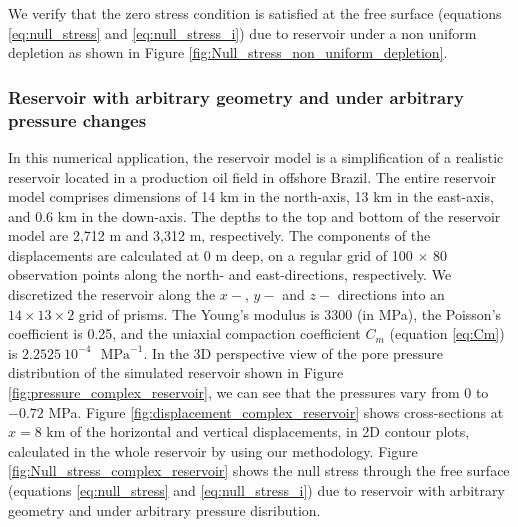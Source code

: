 \documentclass[journal abbreviation, manuscript]{copernicus}
\begin{document}
We verify that the zero stress condition is satisfied at the free surface (equations \ref{eq:null_stress} and \ref{eq:null_stress_i}) due to reservoir under a non uniform depletion as shown in Figure \ref{fig:Null_stress_non_uniform_depletion}.

\subsubsection{Reservoir with arbitrary geometry and under arbitrary pressure changes}

In this numerical application, the reservoir model is a simplification of a realistic reservoir located in a production oil field in offshore Brazil.
The entire reservoir model comprises dimensions of 14 km in the north-axis, 13 km in the
east-axis, and 0.6 km in the down-axis. 
The depths to the top and bottom of the reservoir model are 2,712 m and 3,312 m, respectively. 
The components of the displacements are calculated at 0 m deep, 
on a regular grid of 100 $\times$ 80  observation points along the north- and east-directions, respectively. 
We  discretized the reservoir  along the $x-$, $y-$ and $z-$ directions into an $14 \times 13 \times 2$ grid of prisms.
The Young’s modulus is  3300 (in MPa), the Poisson's coefficient is 0.25, and
the uniaxial compaction coefficient $C_{m}$  (equation \ref{eq:Cm}) is $2.2525 \: 10^{-4}$
$\textrm{ MPa}^{-1}$.
In the 3D perspective view of the pore pressure distribution of the simulated reservoir shown in Figure \ref{fig:pressure_complex_reservoir}, we can see that the pressures vary from $0$ to $-0.72$ MPa.
Figure \ref{fig:displacement_complex_reservoir} shows cross-sections at $x  = 8$ km of the horizontal and vertical displacements, in 2D contour plots, calculated in the whole reservoir by using our methodology.
Figure \ref{fig:Null_stress_complex_reservoir} shows the  null stress through the free surface (equations \ref{eq:null_stress} and \ref{eq:null_stress_i}) due to reservoir with arbitrary geometry and under arbitrary pressure disribution.
\end{document}
